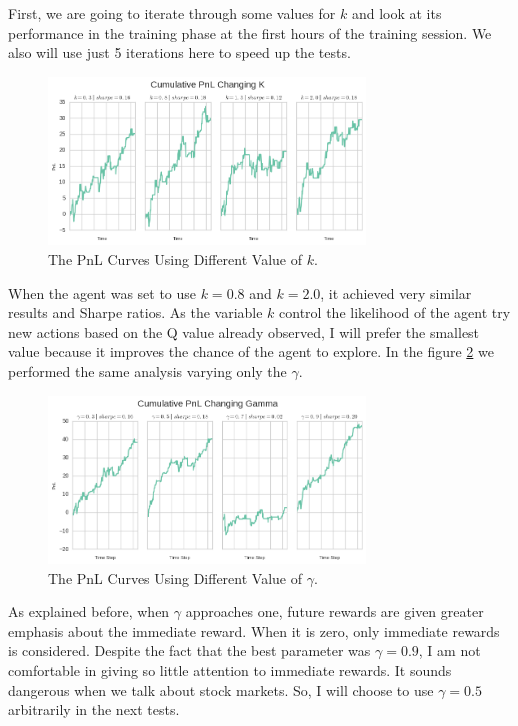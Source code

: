 \documentclass[a4paper]{article}
\begin{document}
First, we are going to iterate through some values for $k$ and look at its performance in the training phase at the first hours of the training session. We also will use just 5 iterations here to speed up the tests.

\begin{figure}[ht]
\centering
\includegraphics[width=0.75\textwidth]{figures/optimize_k.png}
\caption{\label{fig:optimize_k}The PnL Curves Using Different Value of $k$.}
\end{figure}

When the agent was set to use $k=0.8$ and $k=2.0$, it achieved very similar results and Sharpe ratios. As the variable $k$ control the likelihood of the agent try new actions based on the Q value already observed, I will prefer the smallest value because it improves the chance of the agent to explore. In the figure \ref{fig:optimize_gamma} we  performed the same analysis varying only the $\gamma$.

\begin{figure}[ht]
\centering
\includegraphics[width=0.75\textwidth]{figures/optimize_gamma.png}
\caption{\label{fig:optimize_gamma}The PnL Curves Using Different Value of $\gamma$.}
\end{figure}

As explained before, when $\gamma$ approaches one, future rewards are given greater emphasis about the immediate reward. When it is zero, only immediate rewards is considered. Despite the fact that the best parameter was $\gamma = 0.9$, I am not comfortable in giving so little attention to immediate rewards. It sounds dangerous when we talk about stock markets. So, I will choose to use $\gamma = 0.5$ arbitrarily in the next tests.
\end{document}
